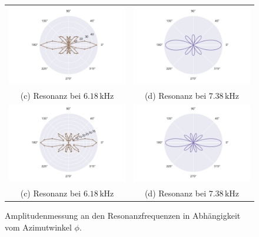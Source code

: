 \begin{figure}
\begin{tabular}{cc}
  \includegraphics[width=65mm]{Daten/Wasserstoff/peak2.pdf} &   \includegraphics[width=65mm]{Daten/Wasserstoff/peakLeg2.pdf} \\
  (c) Resonanz bei $6.18 \,\si{\kilo\hertz}$ & (d) Resonanz bei $7.38 \,\si{\kilo\hertz}$ \\[6pt]
  \includegraphics[width=65mm]{Daten/Wasserstoff/peak3.pdf} &   \includegraphics[width=65mm]{Daten/Wasserstoff/peakLeg3.pdf} \\
  (c) Resonanz bei $6.18 \,\si{\kilo\hertz}$ & (d) Resonanz bei $7.38 \,\si{\kilo\hertz}$ \\[6pt]
  \end{tabular}
  \caption{Amplitudenmessung an den Resonanzfrequenzen in Abhängigkeit vom Azimutwinkel $\phi$. } 
  \label{fig:hpeaks2}
\end{figure}